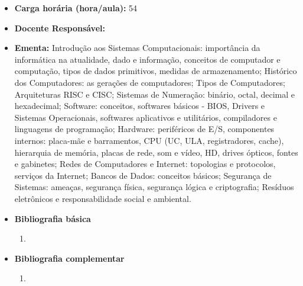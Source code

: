 \documentclass[11pt,fleqn]{book} %
\begin{document}
\begin{itemize}
	\item \textbf{Carga horária (hora/aula):} 54
	\item \textbf{Docente Responsável:}~
	\item \textbf{Ementa:} 
	Introdução aos Sistemas Computacionais: importância da informática na atualidade, dado e informação, conceitos de computador e computação, tipos de dados primitivos, medidas de armazenamento; 
	Histórico dos Computadores: as gerações de computadores; 
	Tipos de Computadores; Arquiteturas RISC e CISC; 
	Sistemas de Numeração: binário, octal, decimal e hexadecimal; 
	Software: conceitos, softwares básicos - BIOS, Drivers e Sistemas Operacionais, softwares aplicativos e utilitários, compiladores e linguagens de programação;
	Hardware: periféricos de E/S, componentes internos: placa-mãe e barramentos, CPU (UC, ULA, registradores, cache), hierarquia de memória, placas de rede, som e vídeo, HD, drives ópticos, fontes e gabinetes;  
	Redes de Computadores e Internet: topologias e protocolos, serviços da Internet; Bancos de Dados: conceitos básicos; Segurança de Sistemas: ameaças, segurança física, segurança lógica e criptografia;
	Resíduos eletrônicos e responsabilidade social e ambiental.
	\item \textbf{Bibliografia básica}
	\begin{enumerate}
		\item 
	\end{enumerate}
	\item \textbf{Bibliografia complementar}
	\begin{enumerate}
		\item 
	\end{enumerate}	
\end{itemize}



\newpage	
\end{document}
